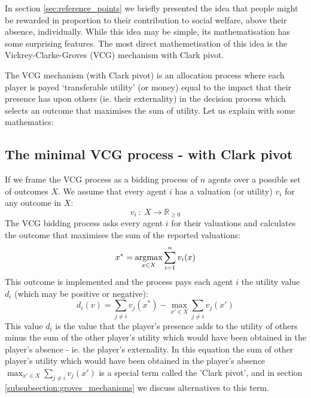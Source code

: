 In section \ref{sec:reference_points} we briefly presented the idea that people might be rewarded in proportion to their contribution to social welfare, above their absence, individually.
While this idea may be simple, its mathematisation has some surprising features.
The most direct mathemetisation of this idea is the Vickrey-Clarke-Groves (VCG) mechanism with Clark pivot.

The VCG mechanism (with Clark pivot) is an allocation process where each player is payed `transferable utility' (or money) equal to the impact that their presence has upon others (ie. their externality) in the decision process which selects an outcome that maximises the sum of utility.
Let us explain with some mathematics:

\subsection{The minimal VCG process - with Clark pivot}
If we frame the VCG process as a bidding process of $n$ agents over a possible set of outcomes $X$.
We assume that every agent $i$ has a valuation (or utility) $v_i$ for any outcome in $X$:
$$ v_i~:~X\rightarrow \mathbb{R}_{\ge 0} $$
The VCG bidding process asks every agent $i$ for their valuations and calculates the outcome that maximises the sum of the reported valuations:
$$ x^* = \operatorname*{\arg\!\max}_{x\in X}\sum_{i=1}^{n}v_i(x) $$
This outcome is implemented and the process pays each agent $i$ the utility value $d_i$ (which may be positive or negative):
\begin{equation}\label{eq:VCG_payment_rule} d_i(v)=\sum_{j\ne i}v_j(x^*) - \max_{x'\in X}\sum_{j\ne i}v_j(x') \end{equation}
This value $d_i$ is the value that the player's presence adds to the utility of others minus the sum of the other player's utility which would have been obtained in the player's absence - ie. the player's externality.
In this equation the sum of other player's utility which would have been obtained in the player's absence $\max_{x'\in X}\sum_{j\ne i}v_j(x')$ is a special term called the 'Clark pivot', and in section \ref{subsubsection:groves_mechanisms} we discuss alternatives to this term.

